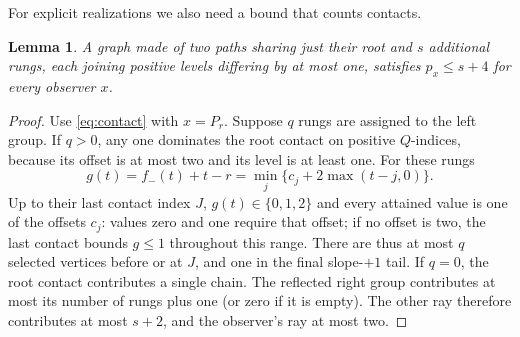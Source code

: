 \documentclass[11pt]{article}
\newtheorem{lemma}[theorem]{Lemma}
\theoremstyle{remark}\newtheorem{remark}[theorem]{Remark}
\begin{document}
For explicit realizations we also need a bound that counts contacts.
\begin{lemma}\label{lem:rungs}
A graph made of two paths sharing just their root and $s$ additional rungs,
each joining positive levels differing by at most one, satisfies $p_x\le s+4$
for every observer $x$.
\end{lemma}
\begin{proof}
Use \eqref{eq:contact} with $x=P_r$. Suppose $q$ rungs are assigned to the
left group. If $q>0$, any one dominates the root contact on positive
$Q$-indices, because its offset is at most two and its level is at least one.
For these rungs
\[
 g(t)=f_-(t)+t-r=\min_j\{c_j+2\max(t-j,0)\}.
\]
Up to their last contact index $J$, $g(t)\in\{0,1,2\}$ and every attained
value is one of the offsets $c_j$: values zero and one require that offset;
if no offset is two, the last contact bounds $g\le1$ throughout this range.
There are thus at most $q$ selected vertices before or at $J$, and one in
the final slope-$+1$ tail. If $q=0$, the root contact contributes a single
chain. The reflected right group contributes at most its number of rungs
plus one (or zero if it is empty). The other ray therefore contributes at
most $s+2$, and the observer's ray at most two.
\end{proof}
\end{document}

